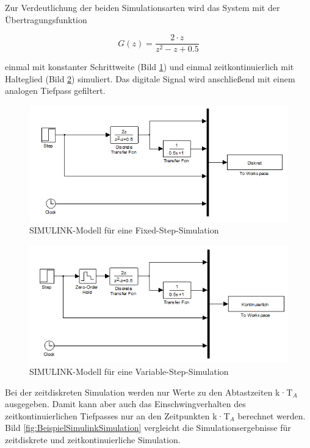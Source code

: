 \noindent Zur Verdeutlichung der beiden Simulationsarten wird das System mit der \"{U}bertragungsfunktion 

\begin{equation}\label{eq:sixsonehundredtwentyseven}
G\left(z\right)=\frac{2\cdot z}{z^{2} -z+0.5}
\end{equation}

\noindent einmal mit konstanter Schrittweite (Bild \ref{fig:SimModel1}) und einmal zeitkontinuierlich mit Halteglied (Bild \ref{fig:SimModel2}) simuliert. Das digitale Signal wird anschlie{\ss}end mit einem analogen Tiefpass gefiltert.

\begin{figure}[H]
  \centerline{\includegraphics[width=1\textwidth]{Kapitel6/Bilder/image19.png}}
  \caption{SIMULINK-Modell f\"{u}r eine Fixed-Step-Simulation}
  \label{fig:SimModel1}
\end{figure}


\begin{figure}[H]
  \centerline{\includegraphics[width=1\textwidth]{Kapitel6/Bilder/image20.png}}
  \caption{SIMULINK-Modell f\"{u}r eine Variable-Step-Simulation}
  \label{fig:SimModel2}
\end{figure}

\noindent Bei der zeitdiskreten Simulation werden nur Werte zu den Abtastzeiten k·T${}_{A}$ ausgegeben. Damit kann aber auch das Einschwingverhalten des zeitkontinuierlichen Tiefpasses nur an den Zeitpunkten k·T${}_{A}$ berechnet werden. Bild \ref{fig:BeispielSimulinkSimulation} vergleicht die Simulationsergebnisse f\"{u}r zeitdiskrete und zeitkontinuierliche Simulation.


